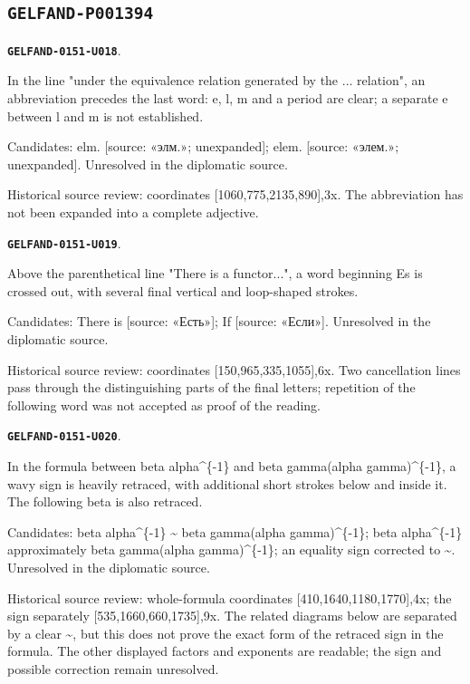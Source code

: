\documentclass[11pt]{article}
\theoremstyle{definition}
\theoremstyle{remark}
\begin{document}
\subsection*{\texttt{GELFAND-P001394}}
\par\noindent\leavevmode{}\label{GELFAND-0151-U018}\label{GELFAND-P001394:elementary-abbrev:note}\textbf{\texttt{GELFAND-0151-U018}}.\nopagebreak[4]\par
In the line "under the equivalence relation generated by the ... relation", an abbreviation precedes the last word: e, l, m and a period are clear; a separate e between l and m is not established.\par
Candidates: elm. [source: «элм.»; unexpanded]; elem. [source: «элем.»; unexpanded]. Unresolved in the diplomatic source.\par
Historical source review: coordinates [1060,775,2135,890],3x. The abbreviation has not been expanded into a complete adjective.\par\medskip
\par\noindent\leavevmode{}\label{GELFAND-0151-U019}\label{GELFAND-P001394:cancelled-there:note}\textbf{\texttt{GELFAND-0151-U019}}.\nopagebreak[4]\par
Above the parenthetical line "There is a functor...", a word beginning Es is crossed out, with several final vertical and loop-shaped strokes.\par
Candidates: There is [source: «Есть»]; If [source: «Если»]. Unresolved in the diplomatic source.\par
Historical source review: coordinates [150,965,335,1055],6x. Two cancellation lines pass through the distinguishing parts of the final letters; repetition of the following word was not accepted as proof of the reading.\par\medskip
\par\noindent\leavevmode{}\label{GELFAND-0151-U020}\label{GELFAND-P001394:fraction-relation:note}\textbf{\texttt{GELFAND-0151-U020}}.\nopagebreak[4]\par
In the formula between beta alpha\textasciicircum{}\{-1\} and beta gamma(alpha gamma)\textasciicircum{}\{-1\}, a wavy sign is heavily retraced, with additional short strokes below and inside it. The following beta is also retraced.\par
Candidates: beta alpha\textasciicircum{}\{-1\} \textasciitilde{} beta gamma(alpha gamma)\textasciicircum{}\{-1\}; beta alpha\textasciicircum{}\{-1\} approximately beta gamma(alpha gamma)\textasciicircum{}\{-1\}; an equality sign corrected to \textasciitilde{}. Unresolved in the diplomatic source.\par
Historical source review: whole-formula coordinates [410,1640,1180,1770],4x; the sign separately [535,1660,660,1735],9x. The related diagrams below are separated by a clear \textasciitilde{}, but this does not prove the exact form of the retraced sign in the formula. The other displayed factors and exponents are readable; the sign and possible correction remain unresolved.\par\medskip
\end{document}
